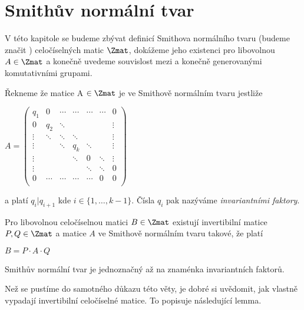 \chapter{Smithův normální tvar}
\setcounter{page}{1}

V této kapitole se budeme zbývat definicí Smithova normálního tvaru (budeme značit \snf) celočíselných matic $\Zmat$, dokážeme jeho existenci pro libovolnou $A \in \Zmat$ a konečně uvedeme souvislost mezi \snf  a konečně generovanými komutativními grupami.

\begin{defi}Řekneme že matice A $ \in \Zmat $ je ve Smithově normálním tvaru jestliže
\begin{center}
$ A =
    \begin{pmatrix}
        q_1     & 0      & \cdots & \cdots & \cdots & \cdots & 0      \\
        0       & q_2    & \ddots &        &        &        & \vdots \\
        \vdots  & \ddots & \ddots & \ddots &        &        & \vdots \\
        \vdots  &        & \ddots & q_k    & \ddots &        & \vdots \\
        \vdots  &        &        & \ddots & 0      & \ddots & \vdots \\
        \vdots  &        &        &        & \ddots & \ddots & 0      \\
        0       & \cdots & \cdots & \cdots & \cdots & 0      & 0      \\
    \end{pmatrix}
$
\end{center}
a platí $q_i | q_{i+1}$ kde $i \in \{1, \dots, k-1\}$. Čísla $q_i$ pak nazýváme
\textit{invariantními faktory}.
\end{defi}


\begin{vet}
    Pro libovolnou celočíselnou matici $ B \in \Zmat $ existují invertibilní
    matice $ P,Q \in \Zmat $ a matice $ A $ ve Smithově normálním tvaru takové,
    že platí
    \begin{center}
        $ B = P \cdot A \cdot Q $
    \end{center}
    Smithův normální tvar je jednoznačný až na znaménka invariantních faktorů.
\end{vet}


Než se pustíme do samotného důkazu této věty, je dobré si uvědomit, jak vlastně
vypadají invertibilní celočíselné matice. To popisuje následující lemma.


